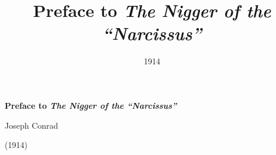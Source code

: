 \title{Preface to \emph{The Nigger of the ``Narcissus''}}
\author{}
\date{1914}


\renewcommand{\chaptername}{Conrad, Preface to \emph{The Nigger of the ``Narcissus''}}

\thispagestyle{plain}


\begin{raggedright}
{\Large \linespread{1.0} \noindent \textbf{Preface to \emph{The Nigger of the ``Narcissus''}} \par} 

{\large Joseph Conrad \par} 

\vspace{0.5em}
\end{raggedright}

\begin{raggedleft}
{\large \linespread{1.2} (1914) \par}
\end{raggedleft}
\vspace{1em}








